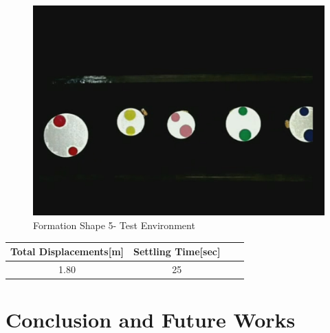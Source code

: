 \documentclass[twoside]{article}
\begin{document}
					\begin{figure}[H]
						\caption{Formation Shape 5- Test Environment}
						\centerline{\includegraphics[scale = 0.35]{9_real_hardware}}
					\end{figure} 
					
					\begin{center}
						 \label{tab:title} 
						\begin{tabular}{||c| c |c |c ||}
							
							\hline
							\textbf{Total Displacements[m]}  & \textbf{Settling Time[sec]}\\ 
							\hline
							1.80 & 25 \\
							\hline
						\end{tabular}
					\end{center}
		
		
		
		
		\section{Conclusion and Future Works}
\end{document}
